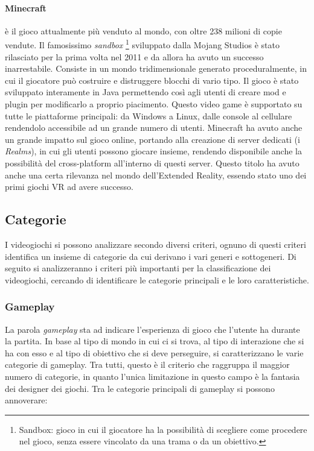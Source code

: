         \paragraph{Minecraft} è il gioco attualmente più venduto al mondo, con oltre 238 milioni di copie vendute. Il famosissimo \textit{sandbox}
            \footnote{Sandbox: gioco in cui il giocatore ha la possibilità di scegliere come procedere nel gioco, senza essere vincolato da una trama o da un obiettivo.}
            sviluppato dalla Mojang Studios è stato
            rilasciato per la prima volta nel 2011 e da allora ha avuto un successo inarrestabile. Consiste in un mondo tridimensionale generato proceduralmente, in cui il giocatore
            può costruire e distruggere blocchi di vario tipo. Il gioco è stato sviluppato interamente in Java permettendo così agli utenti di creare mod e plugin per modificarlo
            a proprio piacimento. Questo video game è supportato su tutte le piattaforme principali: da Windows a Linux, dalle console al cellulare rendendolo accessibile ad un grande
            numero di utenti. Minecraft ha avuto anche un grande impatto sul gioco online, portando alla creazione di server dedicati (i \textit{Realms}), in cui gli utenti possono 
            giocare insieme, rendendo disponibile anche la possibilità del cross-platform all'interno di questi server. Questo titolo ha avuto anche una certa rilevanza nel mondo
            dell'Extended Reality, essendo stato uno dei primi giochi VR ad avere successo.

    \subsection{Categorie}\label{subsec:VideogiochiCategorie}
        I videogiochi si possono analizzare secondo diversi criteri, ognuno di questi criteri identifica un insieme di categorie da cui derivano i vari generi e sottogeneri.
        Di seguito si analizzeranno i criteri più importanti per la classificazione dei videogiochi, cercando di identificare le categorie principali e le loro caratteristiche.

        \subsubsection{Gameplay}
            La parola \textit{gameplay} sta ad indicare l'esperienza di gioco che l'utente ha durante la partita. In base al tipo di mondo in cui ci si trova, al tipo di interazione
            che si ha con esso e al tipo di obiettivo che si deve perseguire, si caratterizzano le varie categorie di gameplay. Tra tutti, questo è il criterio che raggruppa 
            il maggior numero di categorie, in quanto l'unica limitazione in questo campo è la fantasia dei designer dei giochi. Tra le categorie principali di gameplay si possono
            annoverare:
            
